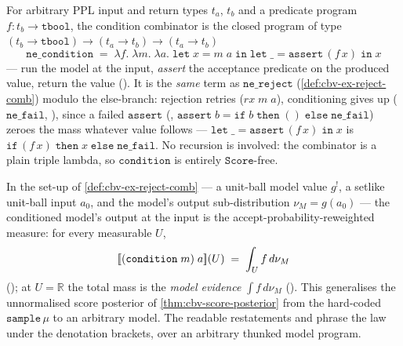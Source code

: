 \begin{definition}\label{def:cbv-ex-condition}
\rocqok
{}\rocqok
{}\rocqok
{}
For arbitrary PPL input and return types $t_a$, $t_b$ and a predicate
program $f : t_b \to \mathtt{tbool}$, the condition combinator is
the closed program of type
$(t_b \to \mathtt{tbool}) \to (t_a \to t_b) \to (t_a \to t_b)$
\[
  \mathtt{ne\_condition}
  \;=\;
  \lambda f.\;\lambda m.\;\lambda a.\;
    \mathtt{let}\;x = m\;a\;\mathtt{in}\;
    \mathtt{let}\;\_ = \mathtt{assert}\,(f\,x)\;\mathtt{in}\;
    x
\]
--- run the model at the input, \emph{assert} the acceptance predicate
on the produced value, return the value
(). It is the
\emph{same} term as $\mathtt{ne\_reject}$
(\autoref{def:cbv-ex-reject-comb}) modulo the else-branch: rejection
retries ($\textit{rx}\;m\;a$), conditioning gives up
($\mathtt{ne\_fail}$, ),
since a failed $\mathtt{assert}$
(,
$\mathtt{assert}\;b = \mathtt{if}\;b\;\mathtt{then}\;()\;\mathtt{else}\;\mathtt{ne\_fail}$)
zeroes the mass whatever value follows ---
$\mathtt{let}\;\_ = \mathtt{assert}\,(f\,x)\;\mathtt{in}\;x$ is
$\mathtt{if}\,(f\,x)\;\mathtt{then}\;x\;\mathtt{else}\;\mathtt{ne\_fail}$.
No recursion is involved: the combinator is a plain triple lambda, so
$\mathtt{condition}$ is entirely $\mathtt{Score}$-free.
\end{definition}

\begin{lemma}\label{lem:cbv-condition-law}
\rocqok
{}\rocqok
{}\rocqok
{}\rocqok
{}
In the set-up of \autoref{def:cbv-ex-reject-comb} --- a unit-ball
model value $g^!$, a setlike unit-ball input $a_0$, and the model's
output sub-distribution $\nu_M = g(a_0)$ --- the conditioned model's
output at the input is the accept-probability-reweighted measure: for every
measurable $U$,
\[
  [\![ (\mathtt{condition}\;m)\;a ]\!](U)
  \;=\;
  \int_U f\,d\nu_M
\]
(); at
$U = \mathbb{R}$ the total mass is the \emph{model evidence}
$\int f\,d\nu_M$
(). This
generalises the unnormalised score posterior of
\autoref{thm:cbv-score-posterior} from the hard-coded
$\mathtt{sample}\,\mu$ to an arbitrary model. The readable
restatements
 and
 phrase
the law under the denotation brackets, over an arbitrary thunked
model program.
\end{lemma}

